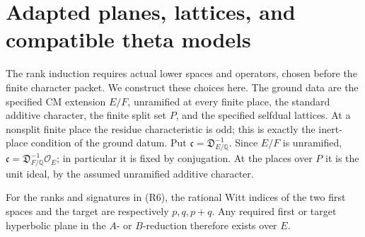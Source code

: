 
\section{Adapted planes, lattices, and compatible theta models}
\label{sec:sr-theta-adapted-tower}

The rank induction requires actual lower spaces and operators, chosen
before the finite character packet. We construct these choices here.
The ground data are the specified CM extension \(E/F\), unramified
at every finite place, the standard additive character, the finite
split set \(P\), and the specified selfdual lattices. At a nonsplit
finite place the residue characteristic is odd; this is exactly the
inert-place condition of the ground datum. Put
\(\mathfrak c=\mathfrak D_{E/\mathbb Q}^{-1}\).
Since \(E/F\) is unramified,
\(\mathfrak c=\mathfrak D_{F/\mathbb Q}^{-1}\mathcal O_E\);
in particular it is fixed by conjugation. At the places over \(P\)
it is the unit ideal, by the assumed unramified additive character.

\begin{srlemma}
\label{lem:sr-theta-rational-planes}
For the ranks and signatures in (R6), the rational Witt indices
of the two first spaces and the target are respectively
\(p,q,p+q\). Any required first or target hyperbolic plane in the
\(A\)- or \(B\)-reduction therefore exists over \(E\).
\end{srlemma}

